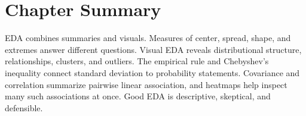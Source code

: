 {\section{Chapter Summary}

EDA combines summaries and visuals.  Measures of center, spread, shape, and extremes answer different questions.  Visual EDA reveals distributional structure, relationships, clusters, and outliers.  The empirical rule and Chebyshev's inequality connect standard deviation to probability statements.  Covariance and correlation summarize pairwise linear association, and heatmaps help inspect many such associations at once.  Good EDA is descriptive, skeptical, and defensible.
}
